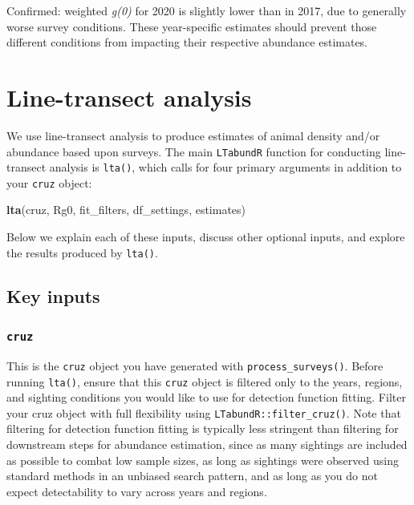 \documentclass[
]{book}
\newenvironment{Shaded}{\begin{snugshade}}{\end{snugshade}}
\newcommand{\FunctionTok}[1]{\textcolor[rgb]{0.13,0.29,0.53}{\textbf{#1}}}
\newcommand{\NormalTok}[1]{#1}
\begin{document}
Confirmed: weighted \emph{g(0)} for 2020 is slightly lower than in 2017, due to generally worse survey conditions. These year-specific estimates should prevent those different conditions from impacting their respective abundance estimates.

\hypertarget{lta}{%
\chapter{Line-transect analysis}\label{lta}}

We use line-transect analysis to produce estimates of animal density and/or abundance based upon surveys. The main \texttt{LTabundR} function for conducting line-transect analysis is \texttt{lta()}, which calls for four primary arguments in addition to your \texttt{cruz} object:

\begin{Shaded}
\begin{Highlighting}[]
\FunctionTok{lta}\NormalTok{(cruz,}
\NormalTok{    Rg0,}
\NormalTok{    fit\_filters,}
\NormalTok{    df\_settings,}
\NormalTok{    estimates)}
\end{Highlighting}
\end{Shaded}

Below we explain each of these inputs, discuss other optional inputs, and explore the results produced by \texttt{lta()}.

\hypertarget{key-inputs}{%
\section*{Key inputs}\label{key-inputs}}

\hypertarget{cruz}{%
\subsection*{\texorpdfstring{\texttt{cruz}}{cruz}}\label{cruz}}

This is the \texttt{cruz} object you have generated with \texttt{process\_surveys()}. Before running \texttt{lta()}, ensure that this \texttt{cruz} object is filtered only to the years, regions, and sighting conditions you would like to use for detection function fitting. Filter your cruz object with full flexibility using \texttt{LTabundR::filter\_cruz()}. Note that filtering for detection function fitting is typically less stringent than filtering for downstream steps for abundance estimation, since as many sightings are included as possible to combat low sample sizes, as long as sightings were observed using standard methods in an unbiased search pattern, and as long as you do not expect detectability to vary across years and regions.
\end{document}
